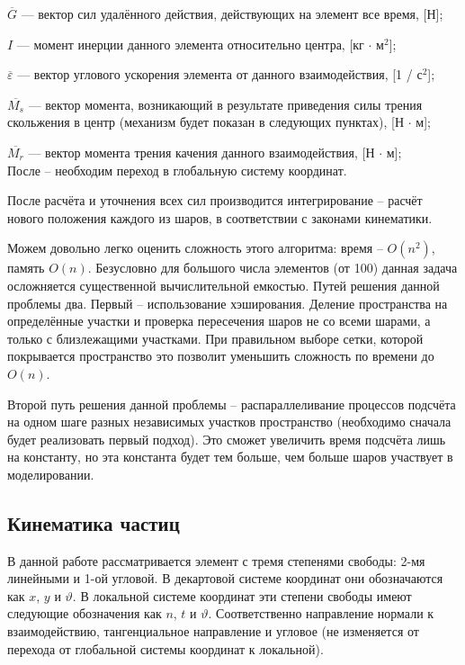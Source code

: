 \documentclass[utf8x, 14pt, oneside, a4paper]{article}
\begin{document}
$\overline{G}$ --- вектор сил удалённого действия, действующих на элемент все время, [Н];

$I$ --- момент инерции данного элемента относительно центра, [кг $ \cdot $ м$^2$];

$ \overline{\varepsilon}$ --- вектор углового ускорения элемента от данного взаимодействия, [1 / с$^2$];

$ \overline{M_s}$ --- вектор момента, возникающий в результате приведения силы трения скольжения в центр (механизм будет показан в следующих пунктах), [Н $ \cdot $ м];

$\overline{M_r}$ --- вектор момента трения качения данного взаимодействия, [Н $ \cdot $ м];
\\

После -- необходим переход в глобальную систему координат.

После расчёта и уточнения всех сил производится интегрирование -- расчёт нового положения каждого из шаров, в соответствии с законами кинематики.

Можем довольно легко оценить сложность этого алгоритма: время -- $O(n^2)$, память $O(n)$. 
Безусловно для большого числа элементов (от 100) данная задача осложняется существенной вычислительной емкостью.
Путей решения данной проблемы два.
Первый -- использование хэширования. 
Деление пространства на определённые участки и проверка пересечения шаров не со всеми шарами, а только с близлежащими участками.
При правильном выборе сетки, которой покрывается пространство это позволит уменьшить сложность по времени до $O(n)$.

Второй путь решения данной проблемы -- распараллеливание процессов подсчёта на одном шаге разных независимых участков пространство (необходимо сначала будет реализовать первый подход). Это сможет увеличить время подсчёта лишь на константу, но эта константа будет тем больше, чем больше шаров участвует в моделировании.




\subsection{Кинематика частиц}
\label{kinem_subsection}

В данной работе рассматривается элемент с тремя степенями свободы: 2-мя линейными и 1-ой угловой.
В декартовой системе координат они обозначаются как $x$, $y$ и $\vartheta$.
В локальной системе координат эти степени свободы имеют следующие обозначения как $n$, $t$ и $\vartheta$. Соответственно направление нормали к взаимодействию, тангенциальное направление и угловое (не изменяется от перехода от глобальной системы координат к локальной).
\end{document}
